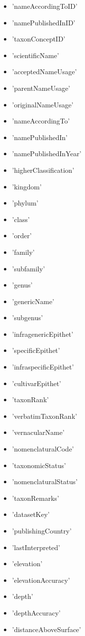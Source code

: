 \documentclass[a4paper]{book}
\begin{document}
\begin{Details}
\begin{itemize}
\item{} 'nameAccordingToID'
\item{} 'namePublishedInID'
\item{} 'taxonConceptID'
\item{} 'scientificName' 
\item{} 'acceptedNameUsage'
\item{} 'parentNameUsage'
\item{} 'originalNameUsage'
\item{} 'nameAccordingTo'
\item{} 'namePublishedIn'
\item{} 'namePublishedInYear'
\item{} 'higherClassification'
\item{} 'kingdom'
\item{} 'phylum'
\item{} 'class'
\item{} 'order'
\item{} 'family' 
\item{} 'subfamily'
\item{} 'genus'
\item{} 'genericName'
\item{} 'subgenus'
\item{} 'infragenericEpithet'
\item{} 'specificEpithet'
\item{} 'infraspecificEpithet'
\item{} 'cultivarEpithet'
\item{} 'taxonRank' 
\item{} 'verbatimTaxonRank'
\item{} 'vernacularName'
\item{} 'nomenclaturalCode' 
\item{} 'taxonomicStatus' 
\item{} 'nomenclaturalStatus'
\item{} 'taxonRemarks'
\item{} 'datasetKey'
\item{} 'publishingCountry'
\item{} 'lastInterpreted'
\item{} 'elevation'
\item{} 'elevationAccuracy'
\item{} 'depth'
\item{} 'depthAccuracy'
\item{} 'distanceAboveSurface'

\end{itemize}
\end{Details}
\end{document}
